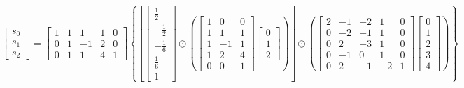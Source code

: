 \documentclass{article}%
\begin{document}
\[%
\left[\begin{matrix}s_{0}\\s_{1}\\s_{2}\end{matrix}\right] = \left[\begin{matrix}1 & 1 & 1 & 1 & 0\\0 & 1 & -1 & 2 & 0\\0 & 1 & 1 & 4 & 1\end{matrix}\right] \left\{ \left[ \left[\begin{matrix}\frac{1}{2}\\- \frac{1}{2}\\- \frac{1}{6}\\\frac{1}{6}\\1\end{matrix}\right] \odot \left( \left[\begin{matrix}1 & 0 & 0\\1 & 1 & 1\\1 & -1 & 1\\1 & 2 & 4\\0 & 0 & 1\end{matrix}\right] \left[\begin{matrix}0\\1\\2\end{matrix}\right] \right) \right] \odot \left( \left[\begin{matrix}2 & -1 & -2 & 1 & 0\\0 & -2 & -1 & 1 & 0\\0 & 2 & -3 & 1 & 0\\0 & -1 & 0 & 1 & 0\\0 & 2 & -1 & -2 & 1\end{matrix}\right] \left[\begin{matrix}0\\1\\2\\3\\4\end{matrix}\right] \right) \right\}%
\]%
\end{document}
